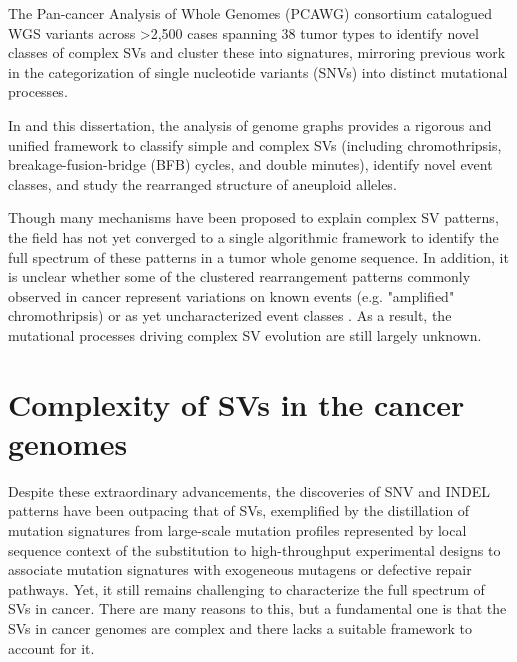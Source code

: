 \documentclass[phd,tocprelim]{cornell}
\begin{document}

The Pan-cancer Analysis of Whole Genomes (PCAWG) consortium catalogued WGS variants across >2,500 cases spanning 38 tumor types\cite{pcawg_marker2020-yi} to identify novel classes of complex SVs and cluster these into signatures, mirroring previous work in the categorization of single nucleotide variants (SNVs) into distinct mutational processes\cite{Li2020-ds,Alexandrov2013-zv,Nik-Zainal2012-dc,Menghi2018-er}. 

In \cite{Hadi2020-um} and this dissertation, the analysis of genome graphs provides a rigorous and unified framework to classify simple and complex SVs (including chromothripsis, breakage-fusion-bridge (BFB) cycles, and double minutes), identify novel event classes, and study the rearranged structure of aneuploid alleles\cite{Hadi2020-um}.

Though many mechanisms have been proposed to explain complex SV patterns, the field has not yet converged to a single algorithmic framework to identify the full spectrum of these patterns in a tumor whole genome sequence. In addition, it is unclear whether some of the clustered rearrangement patterns commonly observed in cancer represent variations on known events (e.g. "amplified" chromothripsis) or as yet uncharacterized event classes \cite{pcawg_marker2020-yi, Li2020sv}. As a result, the mutational processes driving complex SV evolution are still largely unknown.

\section{Complexity of SVs in the cancer genomes}
Despite these extraordinary advancements, the discoveries of SNV and INDEL patterns have been outpacing that of SVs, exemplified by the distillation of mutation signatures from large-scale mutation profiles represented by local sequence context of the substitution \cite{alexandrov2013} to high-throughput experimental designs \cite{Zou2021-je} to associate mutation signatures with exogeneous mutagens or defective repair pathways. Yet, it still remains challenging to characterize the full spectrum of SVs in cancer. There are many reasons to this, but a fundamental one is that the SVs in cancer genomes are complex and there lacks a suitable framework to account for it.
\end{document}
